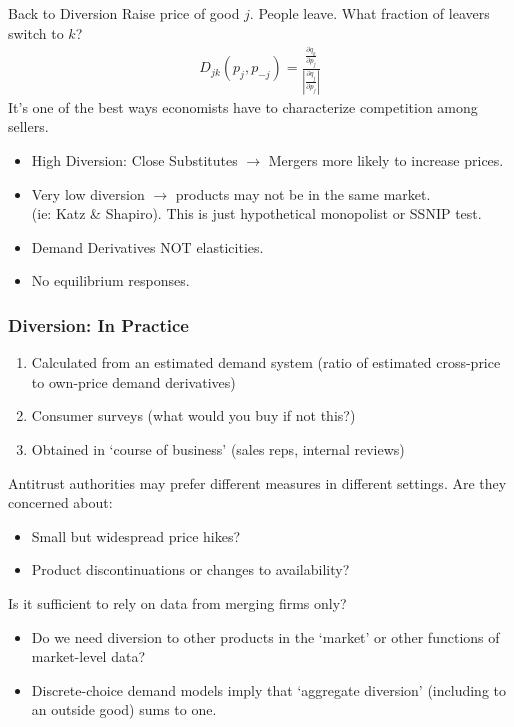 \begin{frame}{Back to Diversion}
 Raise price of good $j$. People leave. What fraction of leavers switch to $k$?
\begin{eqnarray*}
D_{jk} (p_j,p_{-j})= \frac{\frac{\partial q_k}{\partial p_j}}{\left|\frac{\partial q_j}{\partial p_j} \right|}
\end{eqnarray*}
It's one of the best ways economists have to characterize competition among sellers.
\begin{itemize}
\item High Diversion: Close Substitutes $\rightarrow$ Mergers more likely to increase prices.
\item Very low diversion $\rightarrow$ products may not be in the same market.\\ (ie: Katz \& Shapiro). This is just hypothetical monopolist or SSNIP test.
\item Demand Derivatives NOT elasticities.
\item No equilibrium responses.
\end{itemize}
\end{frame}





\begin{frame}
\frametitle{Diversion: In Practice}
\begin{enumerate}
\item Calculated from an estimated demand system (ratio of estimated cross-price to own-price demand derivatives)
\item Consumer surveys (what would you buy if not this?)
\item Obtained in `course of business' (sales reps, internal reviews)
\end{enumerate}
Antitrust authorities may prefer different measures in different settings. Are they concerned about:
\begin{itemize}
\item Small but widespread price hikes?
\item Product discontinuations or changes to availability?
\end{itemize}
Is it sufficient to rely on data from merging firms only?
\begin{itemize}
\item Do we need diversion to other products in the `market' or other functions of market-level data?
\item Discrete-choice demand models imply that `aggregate diversion' (including to an outside good) sums to one.
\end{itemize}
\end{frame}


